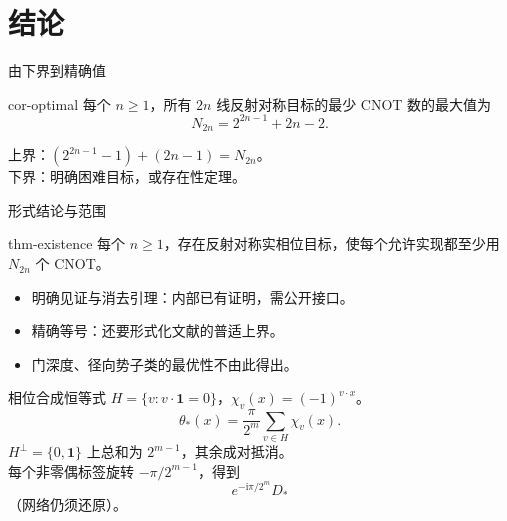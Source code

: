 \documentclass{beamer}
\begin{document}
\section{结论}
\begin{frame}{由下界到精确值}
\begin{bookresult}{cor-optimal}
每个 $n\geq1$，所有 $2n$ 线反射对称目标的最少 CNOT 数的最大值为
\[N_{2n}=2^{2n-1}+2n-2.\]
\end{bookresult}
上界：$(2^{2n-1}-1)+(2n-1)=N_{2n}$。\\
下界：明确困难目标，或存在性定理。
\end{frame}
\begin{frame}{形式结论与范围}
\begin{bookresult}{thm-existence}
每个 $n\geq1$，存在反射对称实相位目标，使每个允许实现都至少用 $N_{2n}$ 个 CNOT。
\end{bookresult}
\begin{itemize}
\item 明确见证与消去引理：内部已有证明，需公开接口。
\item 精确等号：还要形式化文献的普适上界。
\item 门深度、径向势子类的最优性不由此得出。
\end{itemize}
\end{frame}
\appendix
\begin{frame}{相位合成恒等式}
$H=\{v:v\cdot\mathbf1=0\}$，$\chi_v(x)=(-1)^{v\cdot x}$。
\[\theta_*(x)=\frac{\pi}{2^m}\sum_{v\in H}\chi_v(x).\]
$H^\perp=\{0,\mathbf1\}$ 上总和为 $2^{m-1}$，其余成对抵消。\\[.5em]
每个非零偶标签旋转 $-\pi/2^{m-1}$，得到
\[e^{-\mathrm i\pi/2^m}D_*\]
（网络仍须还原）。
\end{frame}
\end{document}
